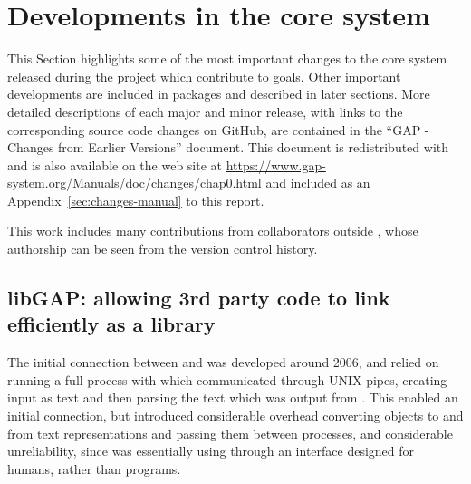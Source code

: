 \section{Developments in the core \GAP system}\label{sec:core-gap}

This Section highlights some of the most important
changes to the core \GAP system released
during the project which contribute to \ODK goals. Other important developments are
included in \GAP packages and described in later sections.  More
detailed descriptions of each major and minor \GAP release, with links
to the corresponding source code changes on GitHub, are contained in
the ``GAP - Changes from Earlier Versions'' document. This document is
redistributed with \GAP and is also available on the \GAP web site at
\url{https://www.gap-system.org/Manuals/doc/changes/chap0.html} and
included as an Appendix~\ref{sec:changes-manual} to this report.

This work includes many contributions from collaborators outside \ODK,
whose authorship can be seen from the version control history.

\subsection{libGAP: allowing 3rd party code to link \GAP efficiently as a library}\label{libgap}

The initial connection between \Sage and \GAP was developed around
2006, and relied on running a full \GAP process with which \Sage
communicated through UNIX pipes, creating \GAP input as text and then parsing
the text which was output from \GAP. This enabled an initial connection, but
introduced considerable overhead converting objects to and from text
representations and passing them between processes, and considerable
unreliability, since \Sage was essentially using \GAP through an
interface designed for humans, rather than programs.

